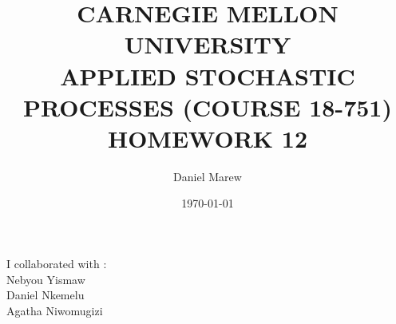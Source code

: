 \documentclass[a4paper,11pt]{article}
\begin{document}
\title{\color{red}CARNEGIE MELLON UNIVERSITY\\
APPLIED STOCHASTIC PROCESSES  (COURSE 18-751)\\
HOMEWORK 12}
\author{Daniel Marew}
\date{\today}
\clearpage\maketitle

\thispagestyle{empty}
\newpage
I collaborated with :\\
\hspace*{6cm}
Nebyou Yismaw\\
\hspace*{6cm}
Daniel    Nkemelu\\
\hspace*{6cm}
Agatha Niwomugizi
\thispagestyle{empty}
\newpage
\clearpage
\setcounter{page}{1}
\section*{}
\end{document}
